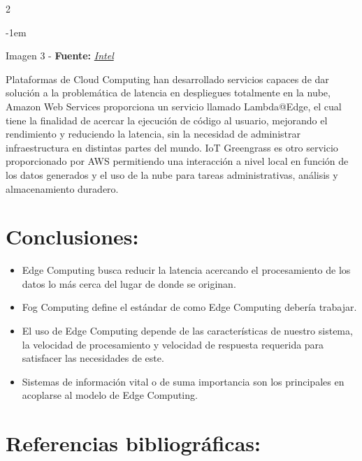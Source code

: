 \documentclass[12pt,spanish,Letterpaper,openany]{book}
\newenvironment{smalltextenv}
  {\begin{center}\kern-1em\color{fondotitulo}\small}%
  {\end{center}}%
\newenvironment{centerimageenv}
  {\noindent \begin{center}}%
  {\end{center}}%
\begin{document}
\begin {multicols}{2}
\begin {centerimageenv}
\end {centerimageenv}

\begin {smalltextenv}

Imagen 3 - \textbf{Fuente:} \emph{\href{https://simplecore.intel.com/newsroom/wp-content/uploads/sites/11/2017/04/Autonomous-Vheicle-Data-1000x500.jpg}{Intel}}

\end {smalltextenv}

Plataformas de Cloud Computing han desarrollado servicios capaces de dar solución a la problemática de latencia en despliegues totalmente en la nube, Amazon Web Services proporciona un servicio llamado Lambda@Edge, el cual tiene la finalidad de acercar la ejecución de código al usuario, mejorando el rendimiento y reduciendo la latencia, sin la necesidad de administrar infraestructura en distintas partes del mundo. IoT Greengrass es otro servicio proporcionado por AWS permitiendo una interacción a nivel local en función de los datos generados y el uso de la nube para tareas administrativas, análisis y almacenamiento duradero.

\hypertarget{conclusiones-1}{%
\section{Conclusiones:}\label{conclusiones-1}}

\begin{itemize}
\item
  Edge Computing busca reducir la latencia acercando el procesamiento de los datos lo más cerca del lugar de donde se originan.
\item
  Fog Computing define el estándar de como Edge Computing debería trabajar.
\item
  El uso de Edge Computing depende de las características de nuestro sistema, la velocidad de procesamiento y velocidad de respuesta requerida para satisfacer las necesidades de este.
\item
  Sistemas de información vital o de suma importancia son los principales en acoplarse al modelo de Edge Computing.
\end{itemize}

\hypertarget{referencias-bibliograficas-1}{%
\section{Referencias bibliográficas:}\label{referencias-bibliograficas-1}}


\end{multicols}
\end{document}
